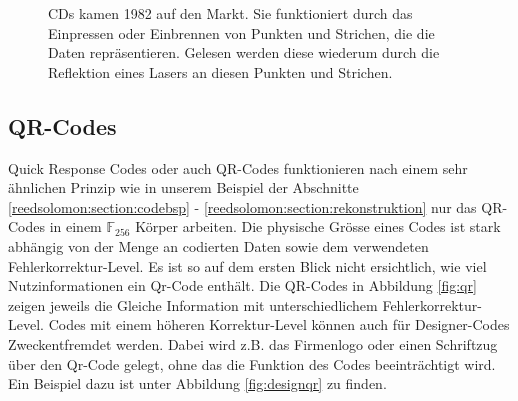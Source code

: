 \begin{figure}
	\centering
	\caption{CDs kamen 1982 auf den Markt. Sie funktioniert durch das Einpressen oder Einbrennen von Punkten und Strichen, die die Daten repräsentieren. Gelesen werden diese wiederum durch die Reflektion eines Lasers an diesen Punkten und Strichen.}
	\label{fig:cd}
\end{figure}

\subsection{QR-Codes}
Quick Response Codes oder auch QR-Codes funktionieren nach einem sehr ähnlichen Prinzip wie in unserem Beispiel der Abschnitte \ref{reedsolomon:section:codebsp} - \ref{reedsolomon:section:rekonstruktion} nur das QR-Codes in einem $\mathbb{F}_{256}$ Körper arbeiten. Die physische Grösse eines Codes ist stark abhängig von der Menge an codierten Daten sowie dem verwendeten Fehlerkorrektur-Level. Es ist so auf dem ersten Blick nicht ersichtlich, wie viel Nutzinformationen ein Qr-Code enthält. Die QR-Codes in Abbildung \ref{fig:qr} zeigen jeweils die Gleiche Information mit unterschiedlichem Fehlerkorrektur-Level. Codes mit einem höheren Korrektur-Level können auch für Designer-Codes Zweckentfremdet werden. Dabei wird z.B. das Firmenlogo oder einen Schriftzug über den Qr-Code gelegt, ohne das die Funktion des Codes beeinträchtigt wird. Ein Beispiel dazu ist unter Abbildung \ref{fig:designqr} zu finden. 

% 

